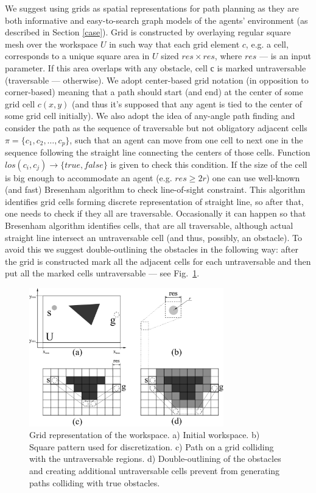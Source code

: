 \documentclass[runningheads,a4paper]{llncs}
\begin{document}
We suggest using grids as spatial representations for path planning as they are both informative and easy-to-search graph models of the agents' environment (as described in Section \ref{case}). Grid is constructed by overlaying regular square mesh over the workspace $U$ in such way that each grid element $c$, e.g. a cell, corresponds to a unique square area in $U$ sized $res \times res$, where $res$ --- is an input parameter. If this area overlaps with any obstacle, cell с is marked untraversable (traversable --- otherwise). We adopt center-based grid notation (in opposition to corner-based) meaning that a path should start (and end) at the center of some grid cell $c(x, y)$ (and thus it's supposed that any agent is tied to the center of some grid cell initially). We also adopt the idea of any-angle path finding \cite{Nash2007} and consider the path as the sequence of traversable but not obligatory adjacent cells $\pi=\{c_1, c_2, \dots, c_p\}$, such that an agent can move from one cell to next one in the sequence following the straight line connecting the centers of those cells. Function $los(c_i, c_j)\rightarrow\{true, false\}$ is given to check this condition. If the size of the cell is big enough to accommodate an agent (e.g. $res\geq 2r$) one can use well-known (and fast) Bresenham algorithm \cite{Bresenham1965} to check line-of-sight constraint. This algorithm identifies grid cells forming discrete representation of straight line, so after that, one needs to check if they all are traversable. Occasionally it can happen so that Bresenham algorithm identifies cells, that are all traversable, although actual straight line intersect an untraversable cell (and thus, possibly, an obstacle). To avoid this we suggest double-outlining the obstacles in the following way: after the grid is constructed mark all the adjacent cells for each untraversable and then put all the marked cells untraversable --- see Fig.~\ref{fig:grid}.

\begin{figure}
	\centering
	\includegraphics[height=6cm]{path_grid}
	\caption{Grid representation of the workspace. a) Initial workspace. b) Square pattern used for discretization. c) Path on a grid colliding with the untraversable regions. d) Double-outlining of the obstacles and creating additional untraversable cells prevent from generating paths colliding with true obstacles.}
	\label{fig:grid}
\end{figure}
\end{document}
